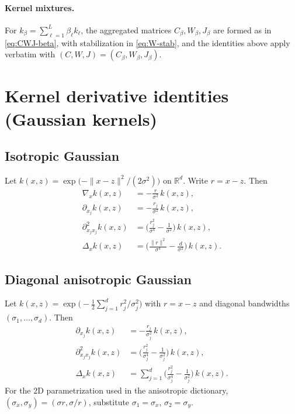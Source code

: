 \documentclass[11pt]{article}
\theoremstyle{remark}
\begin{document}
\paragraph{Kernel mixtures.}
For $k_\beta=\sum_{\ell=1}^L\beta_\ell k_\ell$, the aggregated matrices $C_\beta,W_\beta,J_\beta$
are formed as in \eqref{eq:CWJ-beta}, with stabilization in \eqref{eq:W-stab},
and the identities above apply verbatim with $(C,W,J)=(C_\beta,W_\beta,J_\beta)$.

\section{Kernel derivative identities (Gaussian kernels)}
\label{app:kernel-derivatives}

\subsection{Isotropic Gaussian}
\label{app:isotropic-gaussian}

Let $k(x,z)=\exp\!\big(-\|x-z\|^2/(2\sigma^2)\big)$ on $\mathbb{R}^d$.
Write $r=x-z$.
Then
\begin{align}
\nabla_x k(x,z) &= -\frac{r}{\sigma^2}\,k(x,z), \label{eq:app_grad_iso}\\
\partial_{x_j} k(x,z) &= -\frac{r_j}{\sigma^2}\,k(x,z), \\
\partial_{x_jx_j}^2 k(x,z) &= \Big(\frac{r_j^2}{\sigma^4}-\frac{1}{\sigma^2}\Big)\,k(x,z), \\
\Delta_x k(x,z) &= \Big(\frac{\|r\|^2}{\sigma^4}-\frac{d}{\sigma^2}\Big)\,k(x,z). \label{eq:app_lap_iso}
\end{align}

\subsection{Diagonal anisotropic Gaussian}
\label{app:anisotropic-gaussian}

Let $k(x,z)=\exp\!\big(-\tfrac12\sum_{j=1}^d r_j^2/\sigma_j^2\big)$ with $r=x-z$ and diagonal bandwidths $(\sigma_1,\dots,\sigma_d)$.
Then
\begin{align}
\partial_{x_j} k(x,z) &= -\frac{r_j}{\sigma_j^2}\,k(x,z), \label{eq:app_grad_aniso}\\
\partial_{x_jx_j}^2 k(x,z) &= \Big(\frac{r_j^2}{\sigma_j^4}-\frac{1}{\sigma_j^2}\Big)\,k(x,z), \\
\Delta_x k(x,z) &= \sum_{j=1}^d \Big(\frac{r_j^2}{\sigma_j^4}-\frac{1}{\sigma_j^2}\Big)\,k(x,z). \label{eq:app_lap_aniso}
\end{align}
For the $2$D parametrization used in the anisotropic dictionary,
$(\sigma_x,\sigma_y)=(\sigma r,\sigma/r)$, substitute $\sigma_1=\sigma_x$, $\sigma_2=\sigma_y$.
\end{document}
